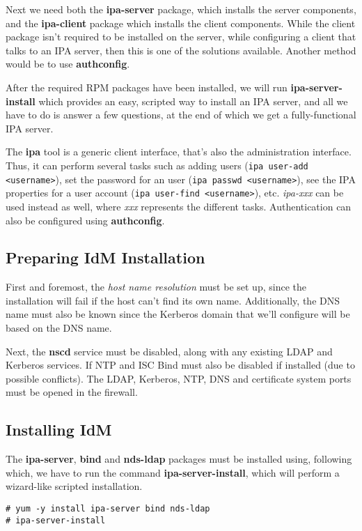 Next we need both the \textbf{ipa-server} package, which installs the server components, and the \textbf{ipa-client} package which installs the client components. While the client package isn't required to be installed on the server, while configuring a client that talks to an IPA server, then this is one of the solutions available. Another method would be to use \textbf{authconfig}. 

After the required RPM packages have been installed, we will run \textbf{ipa-server-install} which provides an easy, scripted way to install an IPA server, and all we have to do is answer a few questions, at the end of which we get a fully-functional IPA server. 

The \textbf{ipa} tool is a generic client interface, that's also the administration interface. Thus, it can perform several tasks such as adding users (\verb|ipa user-add <username>|), set the password for an user (\verb|ipa passwd <username>|), see the IPA properties for a user account (\verb|ipa user-find <username>|), etc. \textit{ipa-xxx} can be used instead as well, where \textit{xxx} represents the different tasks. Authentication can also be configured using \textbf{authconfig}. 

\subsection{Preparing IdM Installation}
First and foremost, the \textit{host name resolution} must be set up, since the installation will fail if the host can't find its own name. Additionally, the DNS name must also be known since the Kerberos domain that we'll configure will be based on the DNS name. 

Next, the \textbf{nscd} service must be disabled, along with any existing LDAP and Kerberos services. If NTP and ISC Bind must also be disabled if installed (due to possible conflicts).	The LDAP, Kerberos, NTP, DNS and certificate system ports must be opened in the firewall. 

\subsection{Installing IdM}
The \textbf{ipa-server}, \textbf{bind} and \textbf{nds-ldap} packages must be installed using, following which, we have to run the command \textbf{ipa-server-install}, which will perform a wizard-like scripted installation. 

\vspace{-15pt}
\begin{verbatim}
# yum -y install ipa-server bind nds-ldap
# ipa-server-install
\end{verbatim}
\vspace{-10pt}

